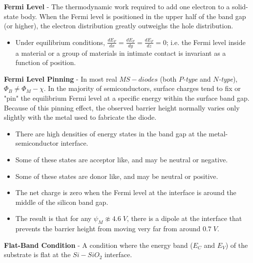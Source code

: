 \vspace{0.5cm}
    \textbf{Fermi Level} - The thermodynamic work required to add one electron to a solid-state body.  When the Fermi level is positioned in the upper half of the band gap (or higher), the electron distribution greatly outweighs the hole distribution.
    \vspace{0.15cm}
    \begin{itemize}
        \setlength\itemsep{0.5em}
        \item{Under equilibrium conditions, $\frac{dE_F}{dx} = \frac{dE_F}{dy} = \frac{dE_F}{dz} = 0$; i.e. the Fermi level inside a material or a group of materials in intimate contact is invariant as a function of position.}
    \end{itemize}
\vspace{0.5cm}
    \textbf{Fermi Level Pinning} - In most real $MS-diodes$ (both $P$\emph{-type} and $N$\emph{-type}), $\Phi_B \not = \Phi_M - \chi$.  In the majority of semiconductors, surface charges tend to fix or "pin" the equilibrium Fermi level at a specific energy within the surface band gap.  Because of this pinning effect, the observed barrier height normally varies only slightly with the metal used to fabricate the diode.
    \vspace{0.15cm}
    \begin{itemize}
        \setlength\itemsep{0.5em}
        \item{There are high densities of energy states in the band gap at the metal-semiconductor interface.}
        \item{Some of these states are acceptor like, and may be neutral or negative.}
        \item{Some of these states are donor like, and may be neutral or positive.}
        \item{The net charge is zero when the Fermi level at the interface is around the middle of the silicon band gap.}
        \item{The result is that for any $\psi_M \not \approx 4.6\;V$, there is a dipole at the interface that prevents the barrier height from moving very far from around $0.7\;V$.}
    \end{itemize}
\vspace{0.5cm}
    \textbf{Flat-Band Condition} - A condition where the energy band ($E_C$ and $E_V$) of the substrate is flat at the $Si-{SiO}_2$ interface.
